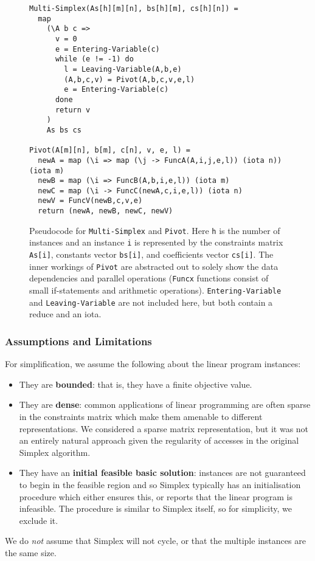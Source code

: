 \begin{figure}[H]
\begin{verbatim}
Multi-Simplex(As[h][m][n], bs[h][m], cs[h][n]) =
  map
    (\A b c =>
      v = 0
      e = Entering-Variable(c)
      while (e != -1) do
        l = Leaving-Variable(A,b,e)
        (A,b,c,v) = Pivot(A,b,c,v,e,l)
        e = Entering-Variable(c)
      done
      return v
    )
    As bs cs

Pivot(A[m][n], b[m], c[n], v, e, l) =
  newA = map (\i => map (\j -> FuncA(A,i,j,e,l)) (iota n)) (iota m)
  newB = map (\i => FuncB(A,b,i,e,l)) (iota m)
  newC = map (\i -> FuncC(newA,c,i,e,l)) (iota n)
  newV = FuncV(newB,c,v,e)
  return (newA, newB, newC, newV)
\end{verbatim}
\caption{Pseudocode for \texttt{Multi-Simplex} and \texttt{Pivot}. Here \texttt{h} is the number of instances and an instance \texttt{i} is represented by the constraints matrix \texttt{As[i]}, constants vector \texttt{bs[i]}, and coefficients vector \texttt{cs[i]}.\newline
The inner workings of \texttt{Pivot} are abstracted out to solely show the data dependencies and parallel operations (\texttt{Funcx} functions consist of small if-statements and arithmetic operations). \texttt{Entering-Variable} and \texttt{Leaving-Variable} are not included here, but both contain a reduce and an iota.}
\label{code:multi-simplex}
\end{figure}

\subsubsection{Assumptions and Limitations}
For simplification, we assume the following about the linear program instances:
\begin{itemize}
\item They are \textbf{bounded}: that is, they have a finite objective value.
\item They are \textbf{dense}: common applications of linear programming are often sparse in the constraints matrix which make them amenable to different representations. We considered a sparse matrix representation, but it was not an entirely natural approach given the regularity of accesses in the original Simplex algorithm.
\item They have an \textbf{initial feasible basic solution}: instances are not guaranteed to begin in the feasible region and so Simplex typically has an initialisation procedure which either ensures this, or reports that the linear program is infeasible. The procedure is similar to Simplex itself, so for simplicity, we exclude it.
\end{itemize}
We do \textit{not} assume that Simplex will not cycle, or that the multiple instances are the same size.

